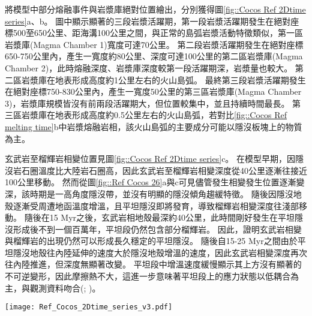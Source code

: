 將模型中部分熔融事件與岩漿庫絕對位置繪出，分別獲得圖\ref{fig::Cocos Ref 2Dtime series}a、b。
圖中顯示顯著的三段岩漿活躍期，第一段岩漿活躍期發生在絕對座標500至650公里、距海溝100公里之間，與正常的島弧岩漿活動特徵類似，第一區岩漿庫(Magma Chamber 1)寬度可達70公里。
第二段岩漿活躍期發生在絕對座標650-750公里內，產生一寬度約80公里、深度可達100公里的第二區岩漿庫(Magma Chamber 2)，此時熔融深度、岩漿庫深度較第一段活躍期深，岩漿量也較大。
第二區岩漿庫在地表形成高度約1公里左右的火山島弧。
最終第三段岩漿活躍期發生在絕對座標750-830公里內，產生一寬度50公里的第三區岩漿庫(Magma Chamber 3)，岩漿庫規模皆沒有前兩段活躍期大，但位置較集中，並且持續時間最長。
第三區岩漿庫在地表形成高度約0.5公里左右的火山島弧，若對比\ref{fig::Cocos Ref melting time}b中岩漿熔融岩相，該火山島弧的主要成分可能以隱沒板塊上的物質為主。

玄武岩至榴輝岩相變位置見圖\ref{fig::Cocos Ref 2Dtime series}c。
在模型早期，因隱沒岩石圈溫度比大陸岩石圈高，因此玄武岩至榴輝岩相變深度從40公里逐漸往接近100公里移動。
然而從圖\ref{fig::Ref Cocos 26}a與c可見儘管發生相變發生位置逐漸變深，該時期是一高角度隱沒帶，並沒有明顯的隱沒傾角趨緩特徵。
隨後因隱沒地殼逐漸受周遭地函溫度增溫，且平坦隱沒即將發育，導致榴輝岩相變深度往淺部移動。
隨後在15 Myr之後，玄武岩相地殼最深約40公里，此時間剛好發生在平坦隱沒形成後不到一個百萬年，平坦段仍然包含部分榴輝岩。
因此，證明玄武岩相變與榴輝岩的出現仍然可以形成長久穩定的平坦隱沒。
隨後自15-25 Myr之間由於平坦隱沒地殼往內陸延伸的速度大於隱沒地殼增溫的速度，因此玄武岩相變深度再次往內陸推進，但深度無顯著改變。
平坦段中增溫速度緩慢顯示其上方沒有顯著的不可逆變形，因此摩擦熱不大，這進一步意味著平坦段上的應力狀態以低耦合為主，與觀測資料吻合(\citealp{moran2007cenozoic}; \citealp{PerezCampos2008})。

\begin{figure*}[ht]
    \centering
    \texttt{[image: Ref\_Cocos\_2Dtime\_series\_v3.pdf]}
    \caption[墨西哥參考模型部分熔融、岩漿庫與玄武岩相變時空關係圖]{墨西哥參考模型部分熔融、岩漿庫與玄武岩相變位置時空關係圖。(a)圓點為墨西哥參考模型於時間軸上部分熔融發生位置，圓點顏色代表時間，僅包含網格中熔融比例大於千分之一的網格。線條為每10 Myr的隱沒板塊頂部介面，分別為10 Myr、20Myr、30 Myr與40 Myr，橫軸上方標示出模型於40 Myr的相對海溝距離。(b)圓點為墨西哥參考模型於時間軸上岩漿庫發生位置，圓點顏色代表時間，僅繪出網格中岩漿比例大於千分之一的網格。線條為每10 Myr的隱沒板塊頂部介面，分別為10 Myr、20Myr、30 Myr與40 Myr，橫軸上方標示出模型於40 Myr的相對海溝距離。粉紅細線標示出三個岩漿庫，並分別在橘色方框中標出文中說明的岩漿庫名稱。(c)圓點為墨西哥參考模型於時間軸上之玄武岩相變位置變化圖，圓點顏色代表時間。}
    \label{fig::Cocos Ref 2Dtime series}
\end{figure*}

